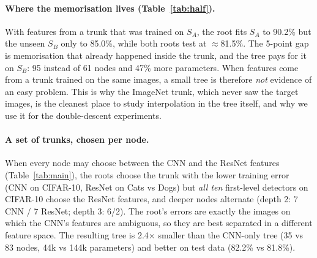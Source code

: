 \begin{table}[t]
\centering\small
\caption{A trunk that has seen the data hides overfitting. CNN trunk trained on half $S_A$ of
CIFAR-10 (82.5\% test); trees grown on $S_A$ and on the unseen half $S_B$ (25k images each).}
\label{tab:half}
\resizebox{\linewidth}{!}{}
\end{table}

\paragraph{Where the memorisation lives (Table~\ref{tab:half}).} With features from a trunk that was
trained on $S_A$, the root fits $S_A$ to 90.2\% but the unseen $S_B$ only to 85.0\%, while both roots
test at $\approx$81.5\%. The 5-point gap is memorisation that already happened inside the trunk, and
the tree pays for it on $S_B$: 95 instead of 61 nodes and 47\% more parameters. When features come from
a trunk trained on the same images, a small tree is therefore \emph{not} evidence of an easy problem.
This is why the ImageNet trunk, which never saw the target images, is the cleanest place to study
interpolation in the tree itself, and why we use it for the double-descent experiments.

\paragraph{A set of trunks, chosen per node.} When every node may choose between the CNN and the
ResNet features (Table~\ref{tab:main}), the roots choose the trunk with the lower training error
(CNN on CIFAR-10, ResNet on Cats vs Dogs) but \emph{all ten} first-level detectors on CIFAR-10 choose the
ResNet features, and deeper nodes alternate (depth 2: 7 CNN / 7 ResNet; depth 3: 6/2). The root's
errors are exactly the images on which the CNN's features are ambiguous, so they are best separated in
a different feature space. The resulting tree is 2.4$\times$ smaller than the CNN-only tree (35 vs 83
nodes, 44k vs 144k parameters) and better on test data (82.2\% vs 81.8\%).

